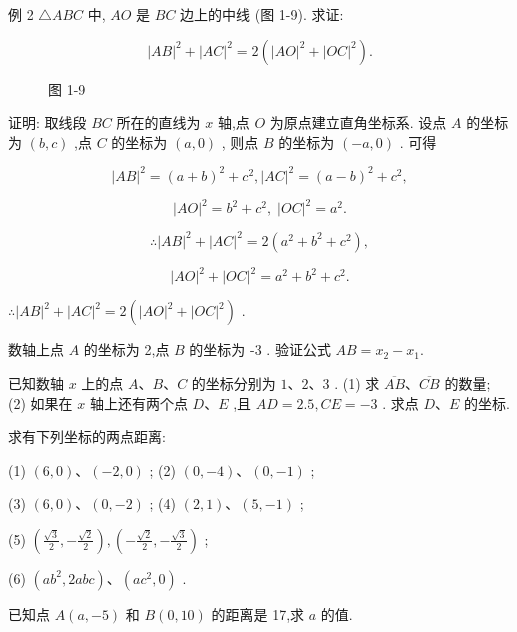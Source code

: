 \documentclass[lang=cn,newtx,10.5pt,scheme=chinese]{elegantbook}
\begin{document}
例 2 \(\bigtriangleup {ABC}\) 中, \({AO}\) 是 \({BC}\) 边上的中线 (图 1-9). 求证:

\[
    {\left| AB\right| }^{2} + {\left| AC\right| }^{2} = 2\left( {{\left| AO\right| }^{2} + {\left| OC\right| }^{2}}\right) .
\]

\begin{figure}[h]
  \centering
  
  \caption{图 1-9}
\end{figure}

证明: 取线段 \({BC}\) 所在的直线为 \(x\) 轴,点 \(O\) 为原点建立直角坐标系. 设点 \(A\) 的坐标为 \(\left( {b,c}\right)\) ,点 \(C\) 的坐标为 \(\left( {a,0}\right)\) , 则点 \(B\) 的坐标为 \(\left( {-a,0}\right)\) . 可得

\[
    {\left| AB\right| }^{2} = {\left( a + b\right) }^{2} + {c}^{2},{\left| AC\right| }^{2} = {\left( a - b\right) }^{2} + {c}^{2},
\]

\[
    {\left| AO\right| }^{2} = {b}^{2} + {c}^{2},\;{\left| OC\right| }^{2} = {a}^{2}.
\]

\[
  \therefore {\left| AB\right| }^{2} + {\left| AC\right| }^{2} = 2\left( {{a}^{2} + {b}^{2} + {c}^{2}}\right) ,
\]

\[
    {\left| AO\right| }^{2} + {\left| OC\right| }^{2} = {a}^{2} + {b}^{2} + {c}^{2}.
\]

\(\therefore {\left| AB\right| }^{2} + {\left| AC\right| }^{2} = 2\left( {{\left| AO\right| }^{2} + {\left| OC\right| }^{2}}\right)\) .

\begin{problemset}[练习]

\item 数轴上点 \(A\) 的坐标为 2,点 \(B\) 的坐标为 -3 . 验证公式 \({AB} = {x}_{2} - {x}_{1}.\)

\item 已知数轴 \(x\) 上的点 \(A\text{、}B\text{、}C\) 的坐标分别为 \(1\text{、}2\text{、}3\) . (1) 求 \(\overline{AB}\text{、}\overline{CB}\) 的数量; (2) 如果在 \(x\) 轴上还有两个点 \(D\text{、}E\) ,且 \({AD} = {2.5},{CE} = - 3\) . 求点 \(D\text{、}E\) 的坐标.

\item 求有下列坐标的两点距离:

(1) \(\left( {6,0}\right) \text{、}\left( {-2,0}\right)\) ; (2) \(\left( {0, - 4}\right) \text{、}\left( {0, - 1}\right)\) ;

(3) \(\left( {6,0}\right) \text{、}\left( {0, - 2}\right)\) ; (4) \(\left( {2,1}\right) \text{、}\left( {5, - 1}\right)\) ;

(5) \(\left( {\frac{\sqrt{3}}{2}, - \frac{\sqrt{2}}{2}}\right) ,\left( {-\frac{\sqrt{2}}{2}, - \frac{\sqrt{3}}{2}}\right)\) ;

(6) \(\left( {a{b}^{2},{2abc}}\right) \text{、}\left( {a{c}^{2},0}\right)\) .

\item 已知点 \(A\left( {a, - 5}\right)\) 和 \(B\left( {0,{10}}\right)\) 的距离是 17,求 \(a\) 的值.

\end{problemset}
\end{document}
